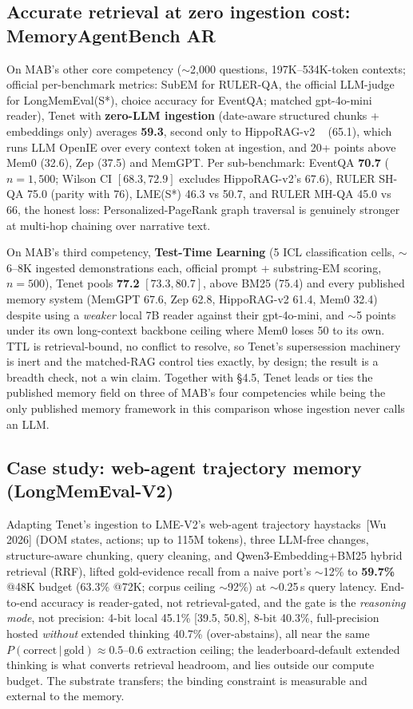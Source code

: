 \documentclass[11pt]{article}
\begin{document}
\subsection{Accurate retrieval at zero ingestion cost: MemoryAgentBench AR}
On MAB's other core competency ($\sim$2{,}000 questions, 197K--534K-token contexts;
official per-benchmark metrics: SubEM for RULER-QA, the official LLM-judge for
LongMemEval(S*), choice accuracy for EventQA; matched gpt-4o-mini reader), Tenet with
\textbf{zero-LLM ingestion} (date-aware structured chunks + embeddings only) averages
\textbf{59.3}, second only to HippoRAG-v2 ~\cite{hipporag2} (65.1), which runs LLM
OpenIE over every context token at ingestion, and 20+ points above Mem0 (32.6),
Zep (37.5) and MemGPT. Per sub-benchmark: EventQA \textbf{70.7} ($n{=}1{,}500$; Wilson CI
$[68.3, 72.9]$ excludes HippoRAG-v2's 67.6), RULER SH-QA 75.0 (parity with 76),
LME(S*) 46.3 vs 50.7, and RULER MH-QA 45.0 vs 66, the honest loss:
Personalized-PageRank graph traversal is genuinely stronger at multi-hop chaining over
narrative text.

On MAB's third competency, \textbf{Test-Time Learning} (5 ICL classification cells,
$\sim$6--8K ingested demonstrations each, official prompt + substring-EM scoring,
$n{=}500$), Tenet pools \textbf{77.2} $[73.3, 80.7]$, above BM25 (75.4) and every
published memory system (MemGPT 67.6, Zep 62.8, HippoRAG-v2 61.4, Mem0 32.4) despite
using a \emph{weaker} local 7B reader against their gpt-4o-mini, and $\sim$5 points
under its own long-context backbone ceiling where Mem0 loses 50 to its own. TTL is
retrieval-bound, no conflict to resolve, so Tenet's supersession machinery is inert
and the matched-RAG control ties exactly, by design; the result is a breadth check, not
a win claim. Together with \S4.5, Tenet leads or ties the published memory field on
three of MAB's four competencies while being the only published memory framework in
this comparison whose ingestion never calls an LLM.

\subsection{Case study: web-agent trajectory memory (LongMemEval-V2)}
Adapting Tenet's ingestion to LME-V2's web-agent trajectory haystacks~[Wu 2026] (DOM
states, actions; up to 115M tokens), three LLM-free changes, structure-aware chunking,
query cleaning, and Qwen3-Embedding{+}BM25 hybrid retrieval (RRF), lifted gold-evidence
recall from a naive port's $\sim$12\% to \textbf{59.7\%} @48K budget (63.3\% @72K;
corpus ceiling $\sim$92\%) at $\sim$0.25\,s query latency. End-to-end accuracy is
reader-gated, not retrieval-gated, and the gate is the \emph{reasoning mode}, not
precision: 4-bit local 45.1\% [39.5, 50.8], 8-bit 40.3\%, full-precision hosted
\emph{without} extended thinking 40.7\% (over-abstains), all near the same
$P(\text{correct}\,|\,\text{gold})\approx0.5$--$0.6$ extraction ceiling; the
leaderboard-default extended thinking is what converts retrieval headroom, and lies
outside our compute budget. The substrate transfers; the binding constraint is
measurable and external to the memory.
\end{document}
